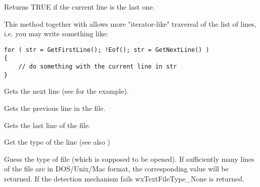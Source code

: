 
Returns TRUE if the current line is the last one.

\label{wxtextfilegetfirstline}


This method together with  
allows more "iterator-like" traversal of the list of lines, i.e. you may
write something like:

\begin{verbatim}
for ( str = GetFirstLine(); !Eof(); str = GetNextLine() )
{
    // do something with the current line in str
}
\end{verbatim}

\label{wxtextfilegetnextline}


Gets the next line (see  for 
the example).

\label{wxtextfilegetprevline}


Gets the previous line in the file.

\label{wxtextfilegetlastline}


Gets the last line of the file.

\label{wxtextfilegetlinetype}


Get the type of the line (see also )

\label{wxtextfileguesstype}


Guess the type of file (which is supposed to be opened). If sufficiently
many lines of the file are in DOS/Unix/Mac format, the corresponding value will
be returned. If the detection mechanism fails wxTextFileType\_None is returned.

\label{wxtextfilegetname}


